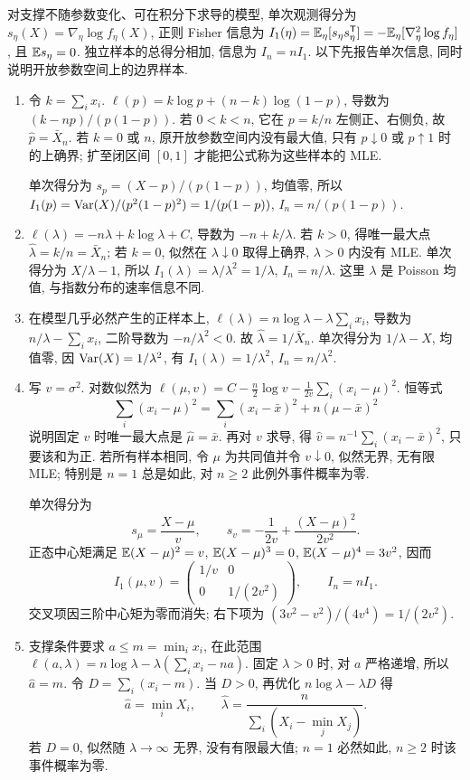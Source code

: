 \begin{solution}
对支撑不随参数变化、可在积分下求导的模型, 单次观测得分为 $s_\eta(X)=\nabla_\eta\log f_\eta(X)$, 正则 Fisher 信息为
$I_1(\eta)=\mathbb E_\eta[s_\eta s_\eta^{\mathsf T}]=-\mathbb E_\eta[\nabla_\eta^2\log f_\eta]$,
且 $\mathbb E s_\eta=0$. 独立样本的总得分相加, 信息为 $I_n=nI_1$. 以下先报告单次信息, 同时说明开放参数空间上的边界样本.
\begin{enumerate}[label=\arabic*.]
\item 令 $k=\sum_i x_i$. $\ell(p)=k\log p+(n-k)\log(1-p)$, 导数为 $(k-np)/(p(1-p))$. 若 $0<k<n$, 它在 $p=k/n$ 左侧正、右侧负, 故 $\hat p=\bar X_n$. 若 $k=0$ 或 $n$, 原开放参数空间内没有最大值, 只有 $p\downarrow0$ 或 $p\uparrow1$ 时的上确界; 扩至闭区间 $[0,1]$ 才能把公式称为这些样本的 MLE.

单次得分为 $s_p=(X-p)/(p(1-p))$, 均值零, 所以 $I_1(p)=\operatorname{Var}(X)/(p^2(1-p)^2)=1/(p(1-p))$, $I_n=n/(p(1-p))$.
\item $\ell(\lambda)=-n\lambda+k\log\lambda+C$, 导数为 $-n+k/\lambda$. 若 $k>0$, 得唯一最大点 $\hat\lambda=k/n=\bar X_n$; 若 $k=0$, 似然在 $\lambda\downarrow0$ 取得上确界, $\lambda>0$ 内没有 MLE. 单次得分为 $X/\lambda-1$, 所以 $I_1(\lambda)=\lambda/\lambda^2=1/\lambda$, $I_n=n/\lambda$. 这里 $\lambda$ 是 Poisson 均值, 与指数分布的速率信息不同.
\item 在模型几乎必然产生的正样本上,
$\ell(\lambda)=n\log\lambda-\lambda\sum_ix_i$, 导数为 $n/\lambda-\sum_ix_i$, 二阶导数为 $-n/\lambda^2<0$. 故 $\hat\lambda=1/\bar X_n$. 单次得分为 $1/\lambda-X$, 均值零, 因 $\operatorname{Var}(X)=1/\lambda^2$, 有 $I_1(\lambda)=1/\lambda^2$, $I_n=n/\lambda^2$.
\item 写 $v=\sigma^2$. 对数似然为 $\ell(\mu,v)=C-\frac n2\log v-\frac1{2v}\sum_i(x_i-\mu)^2$. 恒等式
\[
\sum_i(x_i-\mu)^2=\sum_i(x_i-\bar x)^2+n(\mu-\bar x)^2
\]
说明固定 $v$ 时唯一最大点是 $\hat\mu=\bar x$. 再对 $v$ 求导, 得 $\hat v=n^{-1}\sum_i(x_i-\bar x)^2$, 只要该和为正. 若所有样本相同, 令 $\mu$ 为共同值并令 $v\downarrow0$, 似然无界, 无有限 MLE; 特别是 $n=1$ 总是如此, 对 $n\ge2$ 此例外事件概率为零.

单次得分为
\[
s_\mu=\frac{X-\mu}v,\qquad
s_v=-\frac1{2v}+\frac{(X-\mu)^2}{2v^2}.
\]
正态中心矩满足 $\mathbb E(X-\mu)^2=v$, $\mathbb E(X-\mu)^3=0$, $\mathbb E(X-\mu)^4=3v^2$, 因而
\[
I_1(\mu,v)=\begin{pmatrix}1/v&0\\0&1/(2v^2)\end{pmatrix},\qquad I_n=nI_1.
\]
交叉项因三阶中心矩为零而消失; 右下项为 $(3v^2-v^2)/(4v^4)=1/(2v^2)$.
\item 支撑条件要求 $a\le m=\min_i x_i$, 在此范围
$\ell(a,\lambda)=n\log\lambda-\lambda(\sum_ix_i-na)$.
固定 $\lambda>0$ 时, 对 $a$ 严格递增, 所以 $\hat a=m$. 令 $D=\sum_i(x_i-m)$. 当 $D>0$, 再优化 $n\log\lambda-\lambda D$ 得
\[
\hat a=\min_iX_i,\qquad
\hat\lambda=\frac n{\sum_i(X_i-\min_jX_j)}.
\]
若 $D=0$, 似然随 $\lambda\to\infty$ 无界, 没有有限最大值; $n=1$ 必然如此, $n\ge2$ 时该事件概率为零.


\end{enumerate}
\end{solution}
